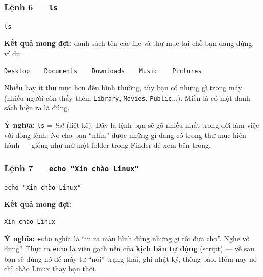 \documentclass[12pt,a4paper]{article}
\begin{document}
\subsubsection{Lệnh 6 — \texttt{ls}}

\begin{labbox}[Lệnh]
\begin{verbatim}
ls
\end{verbatim}
\end{labbox}

\textbf{Kết quả mong đợi:} danh sách tên các file và thư mục tại chỗ bạn đang đứng, ví dụ:

\begin{termbox}
\begin{verbatim}
Desktop    Documents    Downloads    Music    Pictures
\end{verbatim}
\end{termbox}

\begin{notebox}
Nhiều hay ít thư mục hơn đều bình thường, tùy bạn có những gì trong máy (nhiều người còn thấy thêm \texttt{Library}, \texttt{Movies}, \texttt{Public}...). Miễn là có một danh sách hiện ra là đúng.
\end{notebox}

\textbf{Ý nghĩa:} \texttt{ls} = \textit{list} (liệt kê). Đây là lệnh bạn sẽ gõ nhiều nhất trong đời làm việc với dòng lệnh. Nó cho bạn ``nhìn'' được những gì đang có trong thư mục hiện hành — giống như mở một folder trong Finder để xem bên trong.

\subsubsection{Lệnh 7 — \texttt{echo "Xin chào Linux"}}

\begin{labbox}[Lệnh]
\begin{verbatim}
echo "Xin chào Linux"
\end{verbatim}
\end{labbox}

\textbf{Kết quả mong đợi:}

\begin{termbox}
\begin{verbatim}
Xin chào Linux
\end{verbatim}
\end{termbox}

\textbf{Ý nghĩa:} \texttt{echo} nghĩa là ``in ra màn hình đúng những gì tôi đưa cho''. Nghe vô dụng? Thực ra \texttt{echo} là viên gạch nền của \textbf{kịch bản tự động} (script) — về sau bạn sẽ dùng nó để máy tự ``nói'' trạng thái, ghi nhật ký, thông báo. Hôm nay nó chỉ chào Linux thay bạn thôi.
\end{document}
